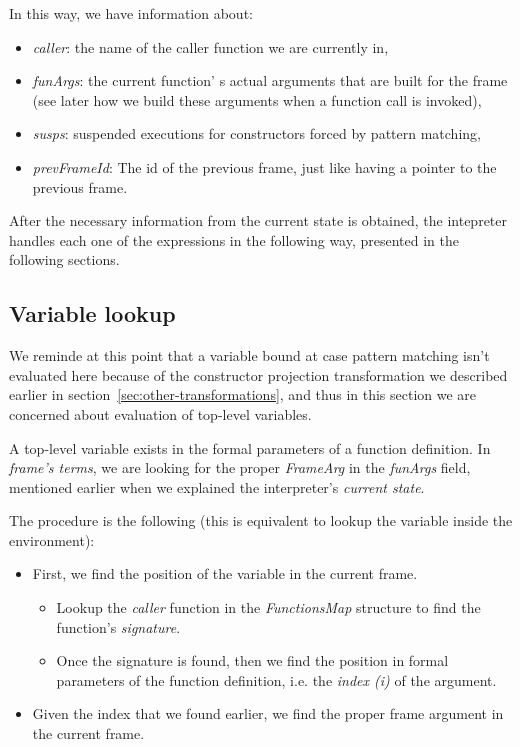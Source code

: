 \documentclass[diploma]{softlab-thesis}
\begin{document}
In this way, we have information about:
\begin{itemize}
  \item \textit{caller}: the name of the caller function we are currently in,
  \item \textit{funArgs}: the current function' s actual arguments that are built for the frame (see later how we build these 
  arguments when a function call is invoked), 
  \item \textit{susps}: suspended executions for constructors forced by pattern matching, 
  \item \textit{prevFrameId}: The id of the previous frame, just like having a pointer to the previous frame.
\end{itemize}

After the necessary information from the current state is obtained, the intepreter handles each one of the expressions
in the following way, presented in the following sections.

\subsection{Variable lookup}

We reminde at this point that a variable bound at case pattern matching isn't evaluated here because of the constructor 
projection transformation we described earlier in section~\ref{sec:other-transformations}, and thus in this section we are concerned about evaluation 
of top-level variables. 

A top-level variable exists in the formal parameters of a function definition. In \textit{frame's terms}, 
we are looking for the proper \textit{FrameArg} in the \textit{funArgs} field, mentioned earlier when we explained 
the interpreter's \textit{current state}.

The procedure is the following (this is equivalent to lookup the variable inside the environment):
\begin{itemize}
  \item First, we find the position of the variable in the current frame.
  \begin{itemize}
    \item Lookup the \textit{caller} function in the \textit{FunctionsMap} structure to find the function's 
    \textit{signature}.
    \item Once the signature is found, then we find the position in formal parameters of the function definition, 
    i.e. the \textit{index (i)} of the argument.
  \end{itemize} 
  \item Given the index that we found earlier, we find the proper frame argument in the current frame. 
\end{itemize}
\end{document}
